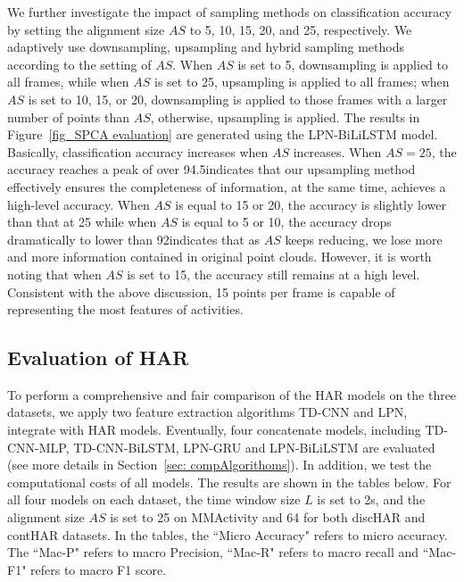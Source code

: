 We further investigate the impact of sampling methods on classification accuracy by setting the alignment size $AS$ to 5, 10, 15, 20, and 25, respectively. 
We adaptively use downsampling, upsampling and hybrid sampling methods according to the setting of $AS$. 
When $AS$ is set to 5, downsampling is applied to all frames, while when $AS$ is set to 25, upsampling is applied to all frames; when $AS$ is set to 10, 15, or 20, downsampling is applied to those frames with a larger number of points than $AS$, otherwise, upsampling is applied. 
The results in Figure~\ref{fig_SPCA evaluation} are generated using the LPN-BiLiLSTM model. 
Basically, classification accuracy increases when $AS$ increases. When $AS=25$, the accuracy reaches a peak of over 94.5\This indicates that our upsampling method effectively ensures the completeness of information, at the same time, achieves a high-level accuracy. 
When $AS$ is equal to 15 or 20, the accuracy is slightly lower than that at 25 while when $AS$ is equal to 5 or 10, the accuracy drops dramatically to lower than 92\This indicates that as $AS$ keeps reducing, we lose more and more information contained in original point clouds. However, it is worth noting that when $AS$ is set to 15, the accuracy still remains at a high level. 
Consistent with the above discussion, 15 points per frame is capable of representing the most features of activities. 

\subsection{Evaluation of HAR}

To perform a comprehensive and fair comparison of the HAR models on the three datasets, we apply two feature extraction algorithms TD-CNN and LPN, integrate with HAR models. Eventually, four concatenate models, including TD-CNN-MLP, TD-CNN-BiLSTM, LPN-GRU and LPN-BiLiLSTM are evaluated (see more details in Section~\ref{sec: compAlgorithoms}). 
In addition, we test the computational costs of all models. The results are shown in the tables below. For all four models on each dataset, the time window size $L$ is set to 2s, and the alignment size $AS$ is set to 25 on MMActivity and 64 for both discHAR and contHAR datasets.
In the tables, the ``Micro Accuracy" refers to micro accuracy. The ``Mac-P" refers to macro Precision, ``Mac-R" refers to macro recall and ``Mac-F1" refers to macro F1 score.


